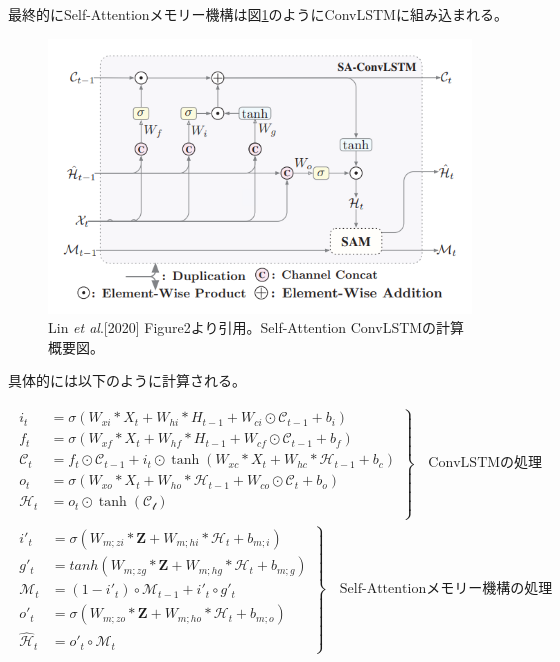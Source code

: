 最終的にSelf-Attentionメモリー機構は図\ref{fig:self-attention-convlstm}のようにConvLSTMに組み込まれる。

\begin{figure}[H]
\begin{center}
\includegraphics[width=0.9\linewidth]{fig/methodologies/self-attention-convlstm.png}
\captionsetup{width=0.9\linewidth}
\caption{Lin \textit{et al}.[2020] Figure2より引用。Self-Attention ConvLSTMの計算概要図。}
\label{fig:self-attention-convlstm}
\end{center}
\end{figure}

具体的には以下のように計算される。

\begin{align}
\left.
\begin{aligned}
	i_{t} &= \sigma(W_{xi} * X_{t} + W_{hi} * H_{t−1} + W_{ci} \odot \mathcal{C}_{t−1} + b_{i})\\ 
	f_{t} &= \sigma(W_{xf} * X_{t} + W_{hf} * H_{t−1} + W_{cf} \odot \mathcal{C}_{t−1} + b_{f}) \\
	\mathcal{C}_{t} &= f_{t} \odot \mathcal{C}_{t−1} + i_{t} \odot \tanh(W_{xc} * X_{t} + W_{hc} * \mathcal{H}_{t−1} + b_{c}) \\
	o_{t} &= \sigma(W_{xo} * X_{t} + W_{ho} * \mathcal{H}_{t−1} + W_{co} \odot \mathcal{C}_{t} + b_{o}) \\
	\mathcal{H}_{t} &= o_{t} \odot \tanh(\mathcal{C_{t}}) \\
\end{aligned}
\right\} \quad \text{ConvLSTMの処理} \\
\left.
\begin{aligned}
	i'_{t} &= \sigma(W_{m;zi} \ast \boldsymbol{Z} + W_{m;hi} \ast \mathcal{H}_{t} + b_{m;i}) \\
	g'_{t} &= tanh(W_{m;zg} \ast \boldsymbol{Z} + W_{m;hg} \ast \mathcal{H}_{t} + b_{m;g}) \\
	\mathcal{M}_{t} &= (1 - i'_{t}) \circ \mathcal{M}_{t-1} + i'_{t} \circ g'_{t} \\
	o'_{t} &= \sigma(W_{m;zo} \ast \boldsymbol{Z} + W_{m;ho} \ast \mathcal{H}_{t} + b_{m;o}) \\
	\hat{\mathcal{H}}_{t} &= o'_{t} \circ \mathcal{M}_{t}
\end{aligned}
\right\} \quad \text{Self-Attentionメモリー機構の処理}
\end{align}
